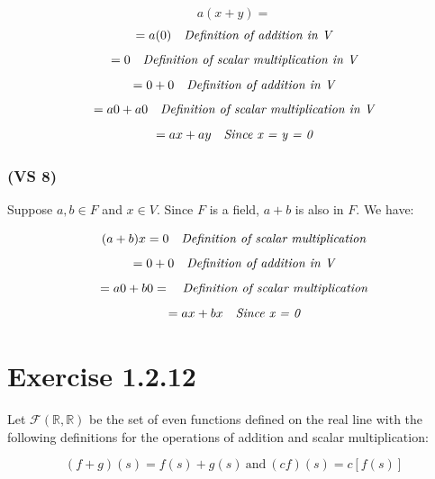 \documentclass{article}
\begin{document}
\begin{equation*}
    a(x + y) = 
\end{equation*}
\begin{equation*}
    = a(0) \ \ \ \emph{Definition of addition in V}
\end{equation*}
\begin{equation*}
    = 0 \ \ \ \emph{Definition of scalar multiplication in V}
\end{equation*}
\begin{equation*}
    = 0 + 0 \ \ \ \emph{Definition of addition in V}
\end{equation*}
\begin{equation*}
    = a0 + a0 \ \ \ \emph{Definition of scalar multiplication in V}
\end{equation*}
\begin{equation*}
    = ax + ay \ \ \ \emph{Since x = y = 0}
\end{equation*}

\subsubsection*{(VS 8)}

Suppose \(a, b \in F\) and \(x \in V\). Since \(F\) is a field, \(a + b\) is also in \(F\).  
We have:

\begin{equation*}
    (a + b)x = 0 \ \ \ \emph{Definition of scalar multiplication}
\end{equation*}
\begin{equation*}
    = 0 + 0 \ \ \ \emph{Definition of addition in V}
\end{equation*}
\begin{equation*}
    = a0 + b0 = \ \ \ \emph{Definition of scalar multiplication}
\end{equation*}
\begin{equation*}
    = ax + bx \ \ \ \emph{Since x = 0}
\end{equation*}

\section*{Exercise 1.2.12}

Let \(\mathcal{F}(\mathbb{R}, \mathbb{R})\) be the set
of even functions defined on the real line with the following
definitions for the operations of addition and scalar multiplication:

\begin{equation*}
    (f + g)(s) = f(s) + g(s) \ \mbox{and} \ (cf)(s) = c[f(s)]
\end{equation*}
\end{document}
